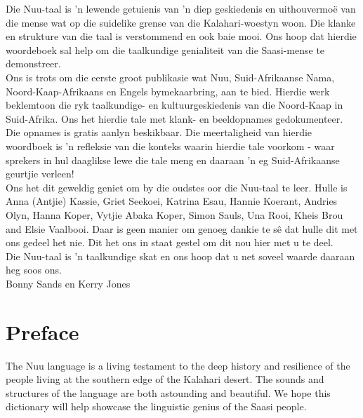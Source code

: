 Die N\textipa{\textvertline}uu-taal is 'n lewende getuienis van 'n
diep geskiedenis en uithouvermo\"{e} van die mense wat op die
suidelike grense van die Kalahari-woestyn woon. Die klanke en
strukture van die taal is verstommend en ook baie mooi. Ons hoop dat
hierdie woordeboek sal help om die taalkundige genialiteit van die
Saasi-mense te demonstreer.\\

Ons is trots om die eerste groot publikasie wat
N\textipa{\textvertline}uu, Suid-Afrikaanse Nama, Noord-Kaap-Afrikaans
en Engels bymekaarbring, aan te bied. Hierdie werk beklemtoon die ryk
taalkundige- en kultuurgeskiedenis van die Noord-Kaap in Suid-Afrika.
Ons het hierdie tale met klank- en beeldopnames gedokumenteer. Die
opnames is gratis aanlyn beskikbaar. Die meertaligheid van hierdie
woordboek is 'n refleksie van die konteks waarin hierdie tale voorkom
- waar sprekers in hul daaglikse lewe die tale meng en daaraan 'n eg
Suid-Afrikaanse geurtjie verleen!\\

Ons het dit geweldig geniet om by die oudstes oor die
N\textipa{\textvertline}uu-taal te leer. Hulle is Anna (Antjie)
Kassie, Griet Seekoei, Katrina Esau, Hannie Koerant, Andries Olyn,
Hanna Koper, Vytjie \textipa{\textvertline}Abaka Koper, Simon Sauls,
\textipa{\textvertline}Una Rooi, Kheis Brou and Elsie Vaalbooi. Daar
is geen manier om genoeg dankie te s\^{e} dat hulle dit met ons gedeel
het nie. Dit het ons in staat gestel om dit nou hier met u te deel.\\

Die N\textipa{\textvertline}uu-taal is 'n taalkundige skat en ons hoop
dat u net soveel waarde daaraan heg soos ons.\\[1em]

\hfill Bonny Sands en Kerry Jones

\markboth{}{}
\addtocounter{section}{-1}
\tocless\section{Preface}
{}
\markboth{}{}

The N\textipa{\textvertline}uu language is a living testament to the
deep history and resilience of the people living at the southern edge
of the Kalahari desert. The sounds and structures of the language are
both astounding and beautiful. We hope this dictionary will help
showcase the linguistic genius of the Saasi people.\\

